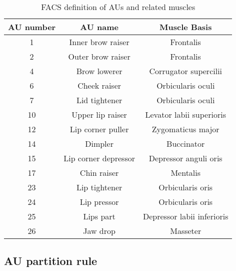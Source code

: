 \documentclass[5p,twocolumn]{elsarticle}
\begin{document}
\begin{table}
	\small	
	\centering
	\caption{FACS definition of AUs and related muscles \cite{ekman1977facial}}
	\label{tab:FACS}
	\tabcolsep=0.05cm
	\begin{tabular}{ccc}
		\toprule
		AU number &  AU name & Muscle Basis \\
		\midrule
		1 & Inner brow raiser & Frontalis \\
		2 & Outer brow raiser & Frontalis \\
		4 & Brow lowerer & Corrugator supercilii \\
		6 & Cheek raiser & Orbicularis oculi \\
		7 & Lid tightener & Orbicularis oculi \\
		10 & Upper lip raiser & Levator labii superioris \\
		12 & Lip corner puller & Zygomaticus major \\
		14 & Dimpler & Buccinator \\
		15 & Lip corner depressor &  Depressor anguli oris  \\
		17 & Chin raiser & Mentalis \\
		23 & Lip tightener & Orbicularis oris \\
		24 & Lip pressor & Orbicularis oris \\
		25 & Lips part	& Depressor labii inferioris\\
		26 & Jaw drop & Masseter \\	
		\bottomrule
	\end{tabular}
	\vspace{-0.5cm}
\end{table}


\begin{comment}
\begin{figure}[htbp]
	\begin{minipage}{0.4\textwidth}
	\begin{center}
		\texttt{[image: figure/facial\_muscle.jpg]}
	\end{center}
	\caption{Facial muscle anatomy \footnotemark}
	\label{fig:facial_muscle}
	 \end{minipage}
\end{figure}
\footnotetext{\url{https://faithanatomy.wikispaces.com/Muscles+of+the+Face}}
\end{comment}
 
 \subsection{AU partition rule}
\label{sec:AU partition rule}
\end{document}
